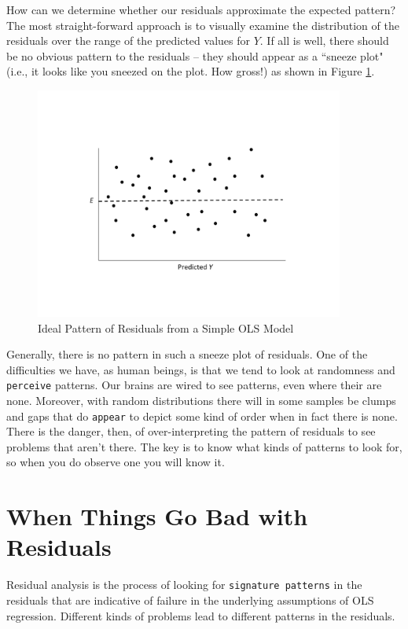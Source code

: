 \documentclass[11pt,openany]{book}\usepackage[]{graphicx}\usepackage[]{color}
\begin{document}
How can we determine whether our residuals approximate the expected pattern? The most straight-forward approach is to visually examine the distribution of the residuals over the range of the predicted values for $Y$. If all is well, there should be no obvious pattern to the residuals -- they should appear as a ``sneeze plot" (i.e.,  it looks like you sneezed on the plot. How gross!) as shown in Figure \ref{fig:sneeze}.

\begin{figure}
  \centering
  \includegraphics[width=4in]{10_SimpleDiagnostics/sneeze.pdf}%
  \caption{Ideal Pattern of Residuals from a Simple OLS Model \label{fig:sneeze}}
\end{figure}

Generally, there is no pattern in such a sneeze plot of residuals. One of the difficulties we have, as human beings, is that we tend to look at randomness and \texttt{perceive} patterns. Our brains are wired to see patterns, even where their are none. Moreover, with random distributions there will in some samples be clumps and gaps that do \texttt{appear} to depict some kind of order when in fact there is none. There is the danger, then, of over-interpreting the pattern of residuals to see problems that aren't there. The key is to know what kinds of patterns to look for, so when you do observe one you will know it.

\section{When Things Go Bad with Residuals} 

Residual analysis is the process of looking for \texttt{signature patterns} in the residuals that are indicative of failure in the underlying assumptions of OLS regression. Different kinds of problems lead to different patterns in the residuals.
\end{document}
